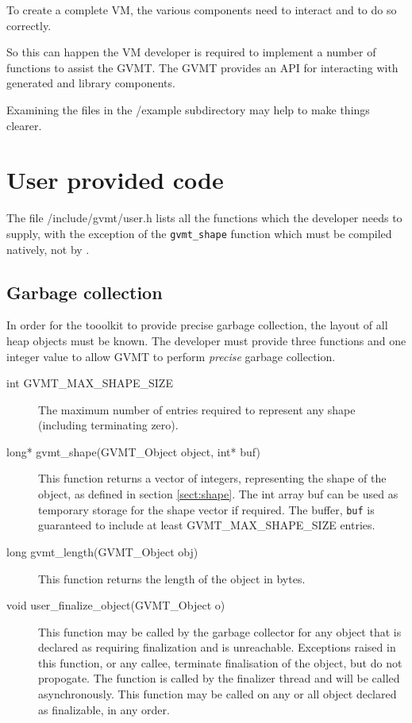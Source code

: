 
To create a complete VM, the various components need to interact and to do so correctly.

So this can happen the VM developer is required to implement a number of functions to assist the GVMT. 
The GVMT provides an API for interacting with generated and library components.

Examining the files in the /example subdirectory may help to make things clearer.

\section{User provided code}

The file /include/gvmt/user.h lists all the functions which the developer needs to supply, with the exception of the \verb|gvmt_shape| function which must be compiled natively, not by \gvmtc.

\subsection{Garbage collection\label{sect:user-shape}}
In order for the tooolkit to provide precise garbage collection, the layout of all heap objects must be known. The developer must provide three functions and one integer value to allow GVMT to perform \emph{precise} garbage collection.
\begin{description}
\item [int GVMT\_MAX\_SHAPE\_SIZE] The maximum number of entries required to represent any shape (including terminating zero).
\item [long* gvmt\_shape(GVMT\_Object object, int* buf)] This function returns a vector of integers, representing the shape of the object, as defined in section \ref{sect:shape}. The int array buf can be used as temporary storage for the shape vector if required. The buffer, \verb|buf| is guaranteed to include at least GVMT\_MAX\_SHAPE\_SIZE entries.
\item [long gvmt\_length(GVMT\_Object obj)] This function returns the length of the object in bytes.
\item [void user\_finalize\_object(GVMT\_Object o)] This function may be called by the garbage collector for any object that is declared as requiring finalization and is unreachable. Exceptions raised in this function, or any callee, terminate finalisation of the object, but do not propogate. The function is called by the finalizer thread and will be called asynchronously. This function may be called on any or all object declared as finalizable, in any order. 
\end{description}

